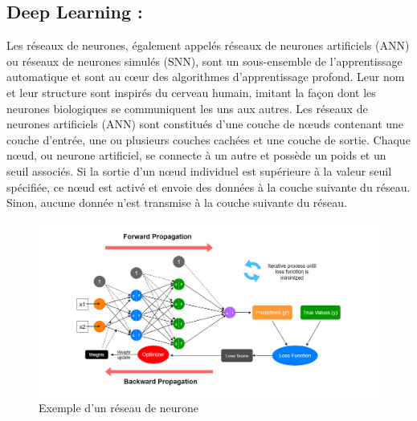 \documentclass[a4paper,12pt]{report}
\begin{document}
\subsection{Deep Learning  : }
\noindent \normalsize Les réseaux de neurones, également appelés réseaux de neurones artificiels (ANN) ou réseaux de neurones simulés (SNN), sont un sous-ensemble de l'apprentissage automatique et sont au cœur des algorithmes d'apprentissage profond. Leur nom et leur structure sont inspirés du cerveau humain, imitant la façon dont les neurones biologiques se communiquent les uns aux autres. Les réseaux de neurones artificiels (ANN) sont constitués d'une couche de nœuds contenant une couche d'entrée, une ou plusieurs couches cachées et une couche de sortie. Chaque nœud, ou neurone artificiel, se connecte à un autre et possède un poids et un seuil associés. Si la sortie d'un nœud individuel est supérieure à la valeur seuil spécifiée, ce nœud est activé et envoie des données à la couche suivante du réseau. Sinon, aucune donnée n’est transmise à la couche suivante du réseau.
\begin{figure}[H]
\centering
 \includegraphics[scale=0.35]{outils-images/data28.png}
\caption{Exemple d'un réseau de neurone}
\end{figure}
\end{document}
